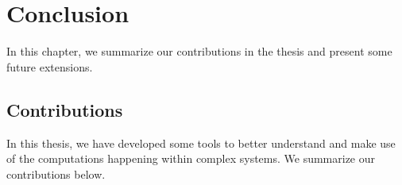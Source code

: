 \chapter{Conclusion}

In this chapter, we summarize our contributions in the thesis and present some
future extensions.
%
\section{Contributions}

In this thesis, we have developed some tools to better understand and make use
of the computations happening within complex systems.
We summarize our contributions below.

